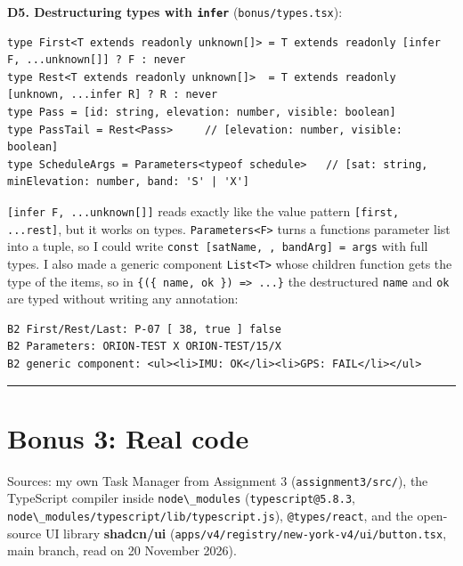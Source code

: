 \textbf{D5. Destructuring types with \passthrough{\lstinline!infer!}} (\passthrough{\lstinline!bonus/types.tsx!}):

\begin{lstlisting}
type First<T extends readonly unknown[]> = T extends readonly [infer F, ...unknown[]] ? F : never
type Rest<T extends readonly unknown[]>  = T extends readonly [unknown, ...infer R] ? R : never
type Pass = [id: string, elevation: number, visible: boolean]
type PassTail = Rest<Pass>     // [elevation: number, visible: boolean]
type ScheduleArgs = Parameters<typeof schedule>   // [sat: string, minElevation: number, band: 'S' | 'X']
\end{lstlisting}

\passthrough{\lstinline![infer F, ...unknown[]]!} reads exactly like the value pattern \passthrough{\lstinline![first, ...rest]!}, but it works on types. \passthrough{\lstinline!Parameters<F>!} turns a function\textquotesingle s parameter list into a tuple, so I could write \passthrough{\lstinline!const [satName, , bandArg] = args!} with full types. I also made a generic component \passthrough{\lstinline!List<T>!} whose children function gets the type of the items, so in \passthrough{\lstinline!\{(\{ name, ok \}) => ...\}!} the destructured \passthrough{\lstinline!name!} and \passthrough{\lstinline!ok!} are typed without writing any annotation:

\begin{lstlisting}
B2 First/Rest/Last: P-07 [ 38, true ] false
B2 Parameters: ORION-TEST X ORION-TEST/15/X
B2 generic component: <ul><li>IMU: OK</li><li>GPS: FAIL</li></ul>
\end{lstlisting}

\begin{center}\rule{0.5\linewidth}{0.5pt}\end{center}

\hypertarget{bonus-3-real-code}{%
\section{Bonus 3: Real code}\label{bonus-3-real-code}}

Sources: my own Task Manager from Assignment 3 (\passthrough{\lstinline!assignment3/src/!}), the TypeScript compiler inside \passthrough{\lstinline!node\_modules!} (\passthrough{\lstinline!typescript@5.8.3!}, \passthrough{\lstinline!node\_modules/typescript/lib/typescript.js!}), \passthrough{\lstinline!@types/react!}, and the open-source UI library \textbf{shadcn/ui} (\passthrough{\lstinline!apps/v4/registry/new-york-v4/ui/button.tsx!}, main branch, read on 20 November 2026).

